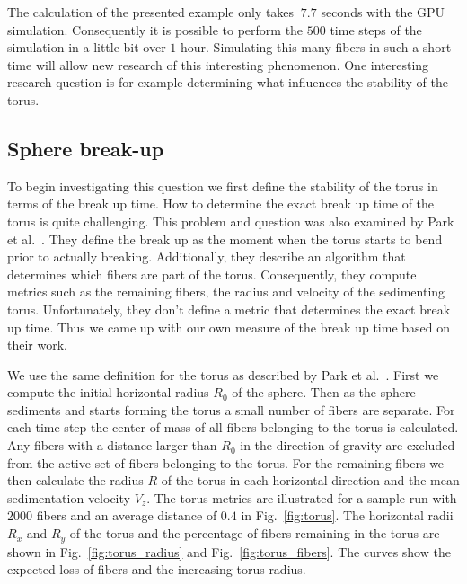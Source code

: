 The calculation of the presented example only takes $~7.7$ seconds with the GPU simulation. Consequently it is possible to perform the $500$ time steps of the simulation in a little bit over $1$ hour. Simulating this many fibers in such a short time will allow new research of this interesting phenomenon. One interesting research question is for example determining what influences the stability of the torus.

\subsection{Sphere break-up}
To begin investigating this question we first define the stability of the torus in terms of the break up time. How to determine the exact break up time of the torus is quite challenging. This problem and question was also examined by Park et al.~\cite{Park2010}. They define the break up as the moment when the torus starts to bend prior to actually breaking. Additionally, they describe an algorithm that determines which fibers are part of the torus. Consequently, they compute metrics such as the remaining fibers, the radius and velocity of the sedimenting torus. Unfortunately, they don't define a metric that determines the exact break up time. Thus we came up with our own measure of the break up time based on their work.

We use the same definition for the torus as described by Park et al.~\cite{Park2010}. First we compute the initial horizontal radius $R_0$ of the sphere. Then as the sphere sediments and starts forming the torus a small number of fibers are separate. For each time step the center of mass of all fibers belonging to the torus is calculated. Any fibers with a distance larger than $R_0$ in the direction of gravity are excluded from the active set of fibers belonging to the torus. For the remaining fibers we then calculate the radius $R$ of the torus in each horizontal direction and the mean sedimentation velocity $V_z$. The torus metrics are illustrated for a sample run with $2000$ fibers and an average distance of $0.4$ in Fig.~\ref{fig:torus}. The horizontal radii $R_x$ and $R_y$ of the torus and the percentage of fibers remaining in the torus are shown in Fig.~\ref{fig:torus_radius} and Fig.~\ref{fig:torus_fibers}. The curves show the expected loss of fibers and the increasing torus radius.

